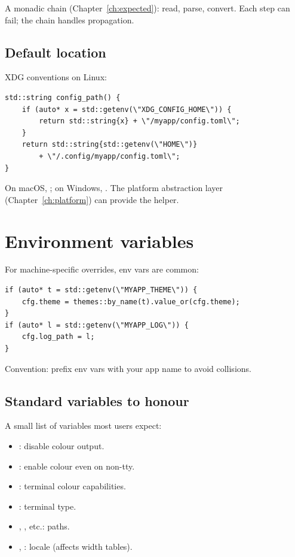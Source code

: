 A monadic chain (Chapter~\ref{ch:expected}): read, parse,
convert. Each step can fail; the chain handles propagation.

\subsection*{Default location}

XDG conventions on Linux:

\begin{lstlisting}
std::string config_path() {
    if (auto* x = std::getenv(\"XDG_CONFIG_HOME\")) {
        return std::string{x} + \"/myapp/config.toml\";
    }
    return std::string{std::getenv(\"HOME\")}
        + \"/.config/myapp/config.toml\";
}
\end{lstlisting}

On macOS, ; on
Windows, .
The platform abstraction layer (Chapter~\ref{ch:platform}) can
provide the helper.

\section{Environment variables}

For machine-specific overrides, env vars are common:

\begin{lstlisting}
if (auto* t = std::getenv(\"MYAPP_THEME\")) {
    cfg.theme = themes::by_name(t).value_or(cfg.theme);
}
if (auto* l = std::getenv(\"MYAPP_LOG\")) {
    cfg.log_path = l;
}
\end{lstlisting}

Convention: prefix env vars with your app name to avoid
collisions.

\subsection*{Standard variables to honour}

A small list of variables most users expect:

\begin{itemize}[leftmargin=*]
  \item {}: disable colour output.
  \item {}: enable colour even on non-tty.
  \item {}: terminal colour capabilities.
  \item {}: terminal type.
  \item {}, , etc.: paths.
  \item {}, : locale (affects width tables).
\end{itemize}

